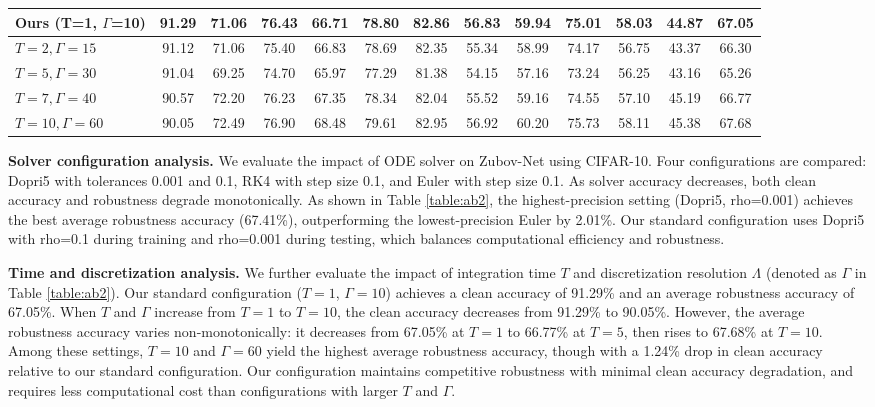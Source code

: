 \documentclass[journal]{IEEEtran}
\begin{document}
{\begin{table}[ht]
\begin{tabular}{lcccccccccccc}
		Ours (T=1, $\Gamma$=10) & 91.29 & 71.06 & 76.43 & 66.71 & 78.80 & 82.86 & 56.83 & 59.94 & 75.01 & 58.03 & 44.87 & 67.05\\ 	\midrule
		$T=2,\Gamma=15$  & 91.12 & 71.06 & 75.40 & 66.83 & 78.69 & 82.35 & 55.34 & 58.99 & 74.17 & 56.75 & 43.37 & 66.30 \\
		$T=5,\Gamma=30$  & 91.04 & 69.25 & 74.70 & 65.97 & 77.29 & 81.38 & 54.15 & 57.16 & 73.24 & 56.25 & 43.16 & 65.26 \\
		$T=7,\Gamma=40$  & 90.57 & 72.20 & 76.23 & 67.35 & 78.34 & 82.04 & 55.52 & 59.16 & 74.55 & 57.10 & 45.19 & 66.77 \\
		$T=10,\Gamma=60$ & 90.05 & 72.49 & 76.90 & 68.48 & 79.61 & 82.95 & 56.92 & 60.20 & 75.73 & 58.11 & 45.38 & 67.68 \\  
		\bottomrule    
	\end{tabular}
\end{table}



\noindent \textbf{Solver configuration analysis.} We evaluate the impact of ODE solver on Zubov-Net using CIFAR-10. Four configurations are compared: Dopri5 with tolerances 0.001 and 0.1, RK4 with step size 0.1, and Euler with step size 0.1. As solver accuracy decreases, both clean accuracy and robustness degrade monotonically. As shown in Table \ref{table:ab2}, the highest-precision setting (Dopri5, rho=0.001) achieves the best average robustness accuracy (67.41\%), outperforming the lowest-precision Euler by 2.01\%. Our standard configuration uses Dopri5 with rho=0.1 during training and rho=0.001 during testing, which balances computational efficiency and robustness.

\noindent \textbf{Time and discretization analysis.} We further evaluate the impact of integration time $T$ and discretization resolution $\Lambda$ (denoted as $\Gamma$ in Table \ref{table:ab2}).  Our standard configuration ($T=1$, $\Gamma=10$) achieves a clean accuracy of 91.29\% and an average robustness accuracy of 67.05\%.  When $T$ and $\Gamma$ increase from $T=1$ to $T=10$, the clean accuracy decreases from 91.29\% to 90.05\%. However, the average robustness accuracy varies non-monotonically: it decreases from 67.05\% at $T=1$ to 66.77\% at $T=5$, then rises to 67.68\% at $T=10$. Among these settings, $T=10$ and $\Gamma=60$ yield the highest average robustness accuracy, though with a 1.24\% drop in clean accuracy relative to our standard configuration. Our configuration maintains competitive robustness with minimal clean accuracy degradation, and requires less computational cost than configurations with larger $T$ and $\Gamma$.


}
\end{document}
